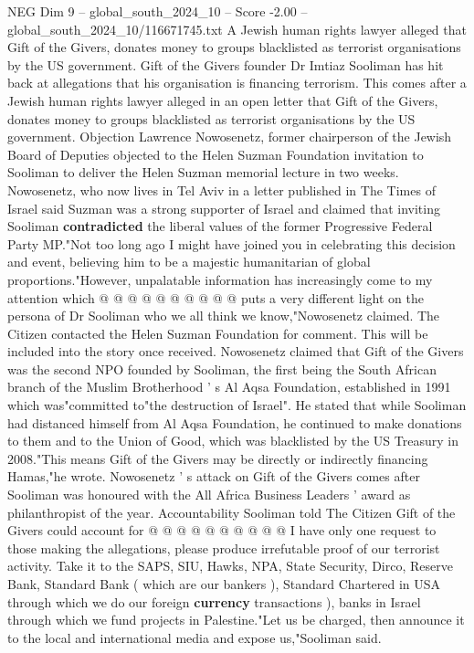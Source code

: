 \begin{textsample}{NEG Dim 9 – global\_south\_2024\_10 – Score -2.00 – global\_south\_2024\_10/116671745.txt}  \label{ex:f9_neg_375}
A Jewish human rights lawyer alleged that Gift of the Givers, donates money to groups blacklisted as terrorist organisations by the US government.
Gift of the Givers founder Dr Imtiaz Sooliman has hit back at allegations that his organisation is financing terrorism.
This comes after a Jewish human rights lawyer alleged in an open letter that Gift of the Givers, donates money to groups blacklisted as terrorist organisations by the US government.
Objection Lawrence Nowosenetz, former chairperson of the Jewish Board of Deputies objected to the Helen Suzman Foundation invitation to Sooliman to deliver the Helen Suzman memorial lecture in two weeks.
Nowosenetz, who now lives in Tel Aviv in a letter published in The Times of Israel said Suzman was a strong supporter of Israel and claimed that inviting Sooliman \textbf{contradicted} the liberal values of the former Progressive Federal Party MP."Not too long ago I might have joined you in celebrating this decision and event, believing him to be a majestic humanitarian of global proportions."However, unpalatable information has increasingly come to my attention which @ @ @ @ @ @ @ @ @ @ puts a very different light on the persona of Dr Sooliman who we all think we know,"Nowosenetz claimed.
The Citizen contacted the Helen Suzman Foundation for comment.
This will be included into the story once received.
Nowosenetz claimed that Gift of the Givers was the second NPO founded by Sooliman, the first being the South African branch of the Muslim Brotherhood ' s Al Aqsa Foundation, established in 1991 which was"committed to"the destruction of Israel".
He stated that while Sooliman had distanced himself from Al Aqsa Foundation, he continued to make donations to them and to the Union of Good, which was blacklisted by the US Treasury in 2008."This means Gift of the Givers may be directly or indirectly financing Hamas,"he wrote.
Nowosenetz ' s attack on Gift of the Givers comes after Sooliman was honoured with the All Africa Business Leaders ' award as philanthropist of the year.
Accountability Sooliman told The Citizen Gift of the Givers could account for @ @ @ @ @ @ @ @ @ @ I have only one request to those making the allegations, please produce irrefutable proof of our terrorist activity.
Take it to the SAPS, SIU, Hawks, NPA, State Security, Dirco, Reserve Bank, Standard Bank ( which are our bankers ), Standard Chartered in USA through which we do our foreign \textbf{currency} transactions ), banks in Israel through which we fund projects in Palestine."Let us be charged, then announce it to the local and international media and expose us,"Sooliman said.

\end{textsample}
